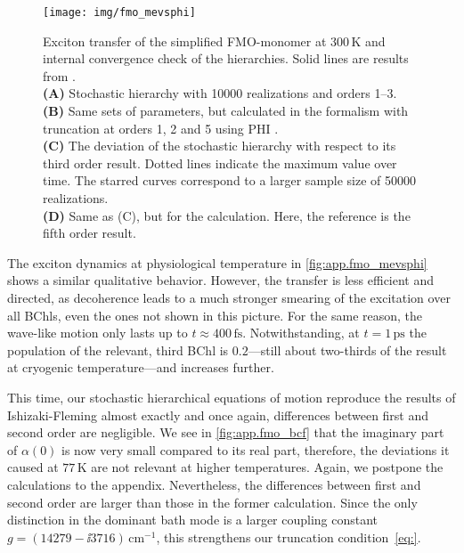 \begin{figure}[p]
  \centering
  \texttt{[image: img/fmo\_mevsphi]}
  \caption{%
    Exciton transfer of the simplified FMO-monomer at 300\,K and internal convergence check of the hierarchies. Solid lines are results from \cite{IsFl09_fmo}.\\
    \textbf{(A)} Stochastic hierarchy with 10000 realizations and orders 1--3.\\
    \textbf{(B)} Same sets of parameters, but calculated in the \HEOM formalism with truncation at orders 1, 2 and 5 using \textsc{PHI} \cite{StSc12_heom}.\\
    \textbf{(C)} The deviation of the stochastic hierarchy with respect to its third order result. Dotted lines indicate the maximum value over time. The starred curves correspond to a larger sample size of 50000 realizations.\\
    \textbf{(D)} Same as (C), but for the \HEOM calculation. Here, the reference is the fifth order result.
  }
  \label{fig:app.fmo_mevsphi}
\end{figure}

The exciton dynamics at physiological temperature in \autoref{fig:app.fmo_mevsphi} shows a similar qualitative behavior.
However, the transfer is less efficient and directed, as decoherence leads to a much stronger smearing of the excitation over all BChls, even the ones not shown in this picture.
For the same reason, the wave-like motion only lasts up to $t \approx 400\,\mathrm{fs}$.
Notwithstanding, at $t = 1\,\mathrm{ps}$ the population of the relevant, third BChl is $0.2$---still about two-thirds of the result at cryogenic temperature---and increases further.

This time, our stochastic hierarchical equations of motion reproduce the results of Ishizaki-Fleming almost exactly and once again, differences between first and second order are negligible.
We see in \autoref{fig:app.fmo_bcf} that the imaginary part of $\alpha(0)$ is now very small compared to its real part, therefore, the deviations it caused at $77\,\mathrm{K}$ are not relevant at higher temperatures.
Again, we postpone the calculations to the appendix.
Nevertheless, the differences between first and second order are larger than those in the former calculation.
Since the only distinction in the dominant bath mode is a larger coupling constant $g=(14279 - \ii3716)\,\mathrm{cm^{-1}}$, this strengthens our truncation condition~\ref{eq:}.

